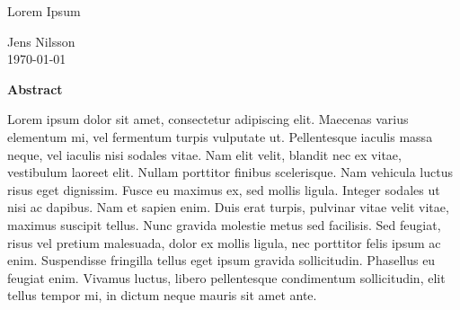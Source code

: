 \begin{titlingpage}
\vspace{5cm}
\Huge
 \begin{center}
Lorem Ipsum\\ 

\hspace{10pt}

\large
Jens Nilsson \\

\vspace{20pt}
\small{\today}

\hspace{10pt}

\normalsize

\begin{minipage}{30em}

\textbf{Abstract}
\hrulefill

\hspace{20pt}
Lorem ipsum dolor sit amet, consectetur adipiscing elit. Maecenas varius elementum mi, vel fermentum turpis vulputate ut. Pellentesque iaculis massa neque, vel iaculis nisi sodales vitae. Nam elit velit, blandit nec ex vitae, vestibulum laoreet elit. Nullam porttitor finibus scelerisque. Nam vehicula luctus risus eget dignissim. Fusce eu maximus ex, sed mollis ligula. Integer sodales ut nisi ac dapibus. Nam et sapien enim. Duis erat turpis, pulvinar vitae velit vitae, maximus suscipit tellus. Nunc gravida molestie metus sed facilisis. Sed feugiat, risus vel pretium malesuada, dolor ex mollis ligula, nec porttitor felis ipsum ac enim. Suspendisse fringilla tellus eget ipsum gravida sollicitudin. Phasellus eu feugiat enim. Vivamus luctus, libero pellentesque condimentum sollicitudin, elit tellus tempor mi, in dictum neque mauris sit amet ante.
\end{minipage}
\end{center}


\end{titlingpage}

